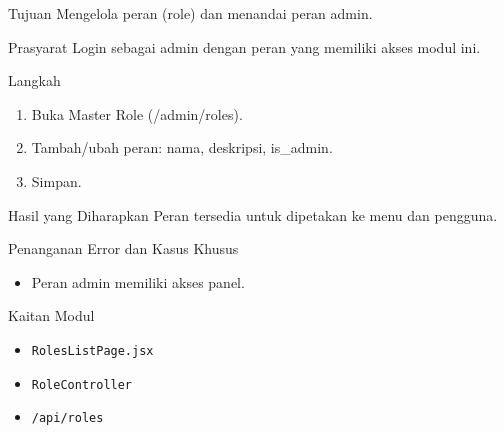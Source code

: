 
\begin{flowsection}{Tujuan}
Mengelola peran (role) dan menandai peran admin.
\end{flowsection}

\begin{flowsection}{Prasyarat}
Login sebagai admin dengan peran yang memiliki akses modul ini.
\end{flowsection}

\begin{flowsection}{Langkah}
\begin{enumerate}
  \item Buka Master Role (/admin/roles).
  \item Tambah/ubah peran: nama, deskripsi, is\_admin.
  \item Simpan.
\end{enumerate}
\end{flowsection}


\begin{flowsection}{Hasil yang Diharapkan}
Peran tersedia untuk dipetakan ke menu dan pengguna.
\end{flowsection}

\begin{flowsection}{Penanganan Error dan Kasus Khusus}
\begin{itemize}
  \item Peran admin memiliki akses panel.
\end{itemize}
\end{flowsection}

\begin{flowsection}{Kaitan Modul}
\begin{itemize}
  \item \texttt{RolesListPage.jsx}
  \item \texttt{RoleController}
  \item \texttt{/api/roles}
\end{itemize}
\end{flowsection}

